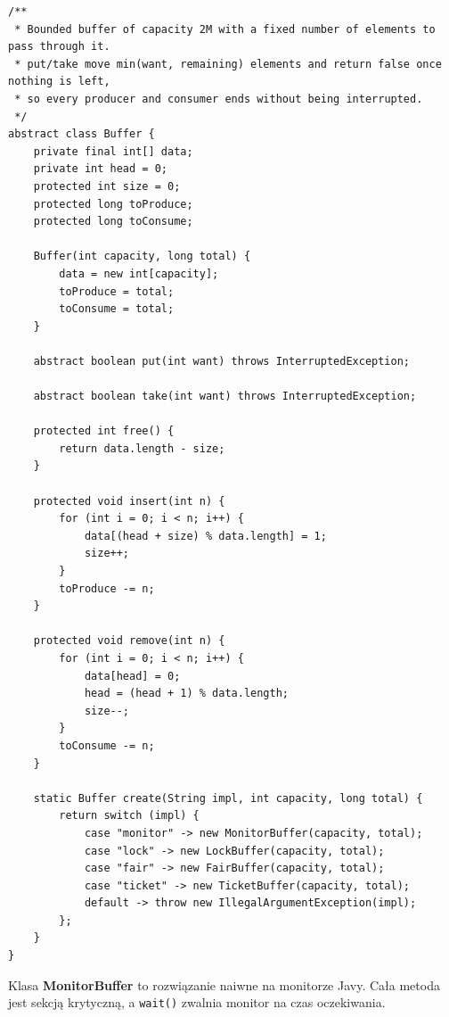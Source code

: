 \documentclass[11pt,a4paper]{article}
\begin{document}
\begin{lstlisting}[caption={Klasa \textbf{Buffer} (\texttt{src/Buffer.java})}]
/**
 * Bounded buffer of capacity 2M with a fixed number of elements to pass through it.
 * put/take move min(want, remaining) elements and return false once nothing is left,
 * so every producer and consumer ends without being interrupted.
 */
abstract class Buffer {
    private final int[] data;
    private int head = 0;
    protected int size = 0;
    protected long toProduce;
    protected long toConsume;

    Buffer(int capacity, long total) {
        data = new int[capacity];
        toProduce = total;
        toConsume = total;
    }

    abstract boolean put(int want) throws InterruptedException;

    abstract boolean take(int want) throws InterruptedException;

    protected int free() {
        return data.length - size;
    }

    protected void insert(int n) {
        for (int i = 0; i < n; i++) {
            data[(head + size) % data.length] = 1;
            size++;
        }
        toProduce -= n;
    }

    protected void remove(int n) {
        for (int i = 0; i < n; i++) {
            data[head] = 0;
            head = (head + 1) % data.length;
            size--;
        }
        toConsume -= n;
    }

    static Buffer create(String impl, int capacity, long total) {
        return switch (impl) {
            case "monitor" -> new MonitorBuffer(capacity, total);
            case "lock" -> new LockBuffer(capacity, total);
            case "fair" -> new FairBuffer(capacity, total);
            case "ticket" -> new TicketBuffer(capacity, total);
            default -> throw new IllegalArgumentException(impl);
        };
    }
}
\end{lstlisting}

Klasa \textbf{MonitorBuffer} to rozwiązanie naiwne na monitorze Javy. Cała metoda jest sekcją krytyczną, a \texttt{wait()} zwalnia monitor na czas oczekiwania.
\end{document}
